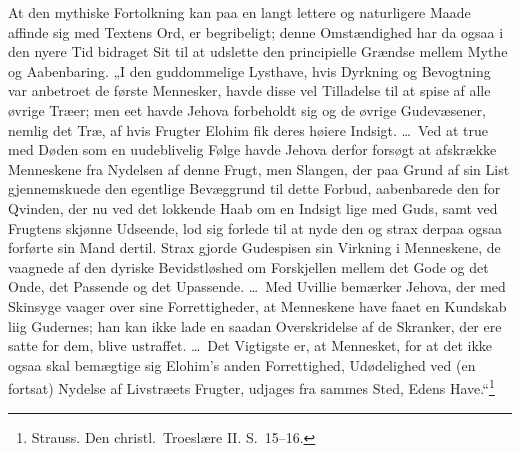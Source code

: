 \documentclass[12pt]{book}
\begin{document}
At den mythiske Fortolkning kan paa en langt lettere og naturligere
Maade affinde sig med Textens Ord, er begribeligt; denne
Omstændighed har da ogsaa i den nyere Tid bidraget Sit til at
udslette den principielle Grændse mellem Mythe og Aabenbaring. „I
den guddommelige Lysthave, hvis Dyrkning og Bevogtning var anbetroet
de første Mennesker, havde disse vel Tilladelse til at spise af alle
øvrige Træer; men eet havde Jehova
forbeholdt sig og de øvrige Gudevæsener, nemlig det Træ, af hvis
Frugter Elohim fik deres høiere Indsigt. \dots\ Ved at true med
Døden som en uudeblivelig Følge havde Jehova derfor forsøgt at
afskrække Menneskene fra Nydelsen af denne Frugt, men Slangen, der
paa Grund af sin List gjennemskuede den egentlige Bevæggrund til
dette Forbud, aabenbarede den for Qvinden, der nu ved det lokkende
Haab om en Indsigt lige med Guds, samt ved Frugtens skjønne
Udseende, lod sig forlede til at nyde den og strax derpaa ogsaa
forførte sin Mand dertil. Strax gjorde Gudespisen sin Virkning i
Menneskene, de vaagnede af den dyriske Bevidstløshed om Forskjellen
mellem det Gode og det Onde, det Passende og det Upassende. \dots\
Med Uvillie bemærker Jehova, der med Skinsyge vaager over sine
Forrettigheder, at Menneskene have faaet en Kundskab liig Gudernes;
han kan ikke lade en saadan Overskridelse af de Skranker, der ere
satte for dem, blive ustraffet. \dots\ Det Vigtigste er, at
Mennesket, for at det ikke ogsaa skal bemægtige sig Elohim's anden
Forrettighed, Udødelighed ved (en fortsat) Nydelse af Livstræets
Frugter, udjages fra sammes Sted, Edens Have.“\footnote{Strauss. Den
christl.\ Troeslære II. S.\ 15--16.}
\end{document}
